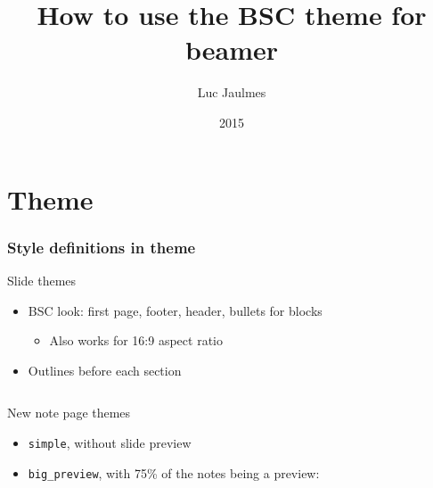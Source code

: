 \documentclass[aspectratio=169,c,12pt]{beamer}
\title[BSC styled beamer tutorial]{How to use the BSC theme for beamer}
\author{Luc Jaulmes}
\date{2015}
\begin{document}
\begin{frame}
\titlepage
\end{frame}

\section{Theme}

\begin{frame}[fragile]
	\frametitle{Style definitions in theme}
	\begin{block}{Slide themes}
		\begin{itemize}
			\item BSC look: first page, footer, header, bullets for blocks
			\begin{itemize}
				\item Also works for 16:9 aspect ratio
			\end{itemize}
			\item Outlines before each section
		\end{itemize}
	\end{block}
	\pause
	\begin{columns}[T]
		\begin{column}{.4\linewidth}
			\begin{block}{New note page themes}
				\begin{itemize}
					\item \verb|simple|, without slide preview
					\item \verb|big_preview|, with 75\% of the notes being a preview:
				\end{itemize}%
			\end{block}
		\end{column}
		\begin{column}{.65\linewidth}
		\end{column}
	\end{columns}
\end{frame}
\end{document}
